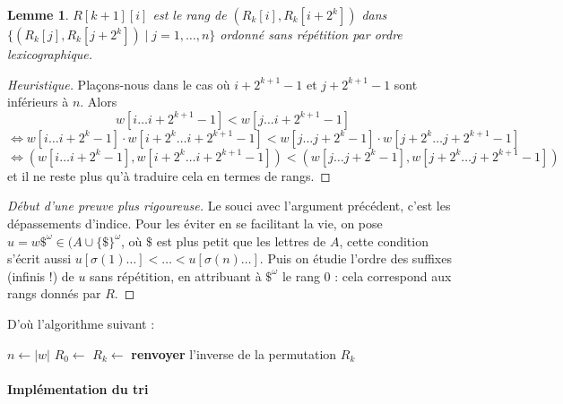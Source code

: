 \documentclass[a4paper, 11pt]{article}
\newtheorem*{lemma}{Lemme}
\begin{document}
\begin{lemma}
  $R[k+1][i]$ est le rang de $(R_k[i], R_k[i+2^k])$ dans $\{ (R_k[j],
  R_k[j+2^k]) \mid j = 1, \ldots, n \}$ ordonné sans répétition par ordre
  lexicographique.
\end{lemma}

\begin{proof}[Heuristique]
  Plaçons-nous dans le cas où $i + 2^{k+1} - 1$ et $j + 2^{k+1} - 1$ sont
  inférieurs à $n$. Alors
  \[ w[i \ldots i + 2^{k+1} - 1] < w[j \ldots i + 2^{k+1} - 1] \]
\[    \Leftrightarrow
    w[i \ldots i + 2^{k} - 1] \cdot w[i + 2^k \ldots i + 2^{k+1} - 1] <
    w[j \ldots j + 2^{k} - 1] \cdot w[j + 2^k \ldots j + 2^{k+1} - 1]
  \]
\[  \Leftrightarrow
    (w[i \ldots i + 2^{k} - 1], w[i + 2^k \ldots i + 2^{k+1} - 1]) <
    (w[j \ldots j + 2^{k} - 1], w[j + 2^k \ldots j + 2^{k+1} - 1])
  \]
  et il ne reste plus qu'à traduire cela en termes de rangs.
\end{proof}

\begin{proof}[Début d'une preuve plus rigoureuse]
  Le souci avec l'argument précédent, c'est les dépassements d'indice. Pour les
  éviter en se facilitant la vie, on pose $u = w\$^\omega \in (A \cup
  \{\$\}^\omega$, où $ \$ $ est plus petit que les lettres de $A$, cette
  condition s'écrit aussi $u[\sigma(1)\ldots] < \ldots < u[\sigma(n)\ldots]$.
  Puis on étudie l'ordre des suffixes (infinis !) de $u$ sans répétition, en
  attribuant à $\$^\omega$ le rang 0 : cela correspond aux rangs donnés par $R$.
\end{proof}

\newpage

D'où l'algorithme suivant :
\begin{algorithm}
\begin{algorithmic}
  \State $n \gets |w|$
  \State $R_0 \gets $ 
  \State $R_k \gets $ 
  \EndFor
  \State \textbf{renvoyer} l'inverse de la permutation $R_k$
  \EndProcedure
\end{algorithmic}
\end{algorithm}

\paragraph{Implémentation du tri}
\end{document}
